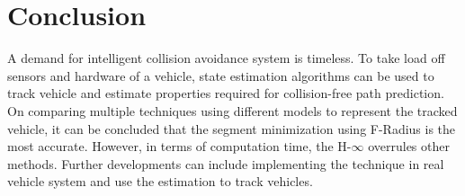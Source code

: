 \chapter{Conclusion} \label{ch:conclusion}
A demand for intelligent collision avoidance system is timeless. To take load off sensors and hardware of a vehicle, state estimation algorithms can be used to track vehicle and estimate properties required for collision-free path prediction. On comparing multiple techniques using different models to represent the tracked vehicle, it can be concluded that the segment minimization using F-Radius is the most accurate. However, in terms of computation time, the H-$\infty$ overrules other methods. Further developments can include implementing the technique in real vehicle system and use the estimation to track vehicles.